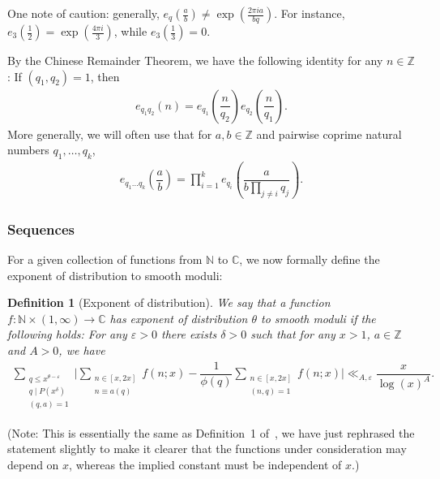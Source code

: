 \documentclass{amsart}
\newtheorem{defn}{Definition}
\numberwithin{equation}{section}
\begin{document}
One note of caution: generally, $e_q(\frac{a}{b}) \neq \exp(\frac{2\pi i a}{bq})$. For instance, $e_3(\frac{1}{2}) = \exp(\frac{4\pi i}{3})$, while $e_3(\frac{1}{3})=0$.

\vspace{3mm}
By the Chinese Remainder Theorem, we have the following  identity for any $n \in \mathbb{Z}$: If $(q_1,q_2)=1$, then
\begin{align*}
e_{q_1q_2}\left(n\right)=e_{q_1}\left(\dfrac{n}{q_2}\right)e_{q_2}\left(\dfrac{n}{q_1}\right).
\end{align*}
More generally, we will often use that for $a,b \in \mathbb{Z}$ and pairwise coprime natural numbers $q_1, \dots, q_k$,
\begin{align} \label{CRT}
e_{q_1\dots q_k}\left(\dfrac{a}{b}\right)=\prod_{i=1}^k e_{q_i}\left(\dfrac{a}{b\prod_{j \neq i} q_j}\right).
\end{align}

\subsubsection{Sequences}

For a given collection of functions from $\mathbb{N}$ to $\mathbb{C}$, we now formally define the  exponent of distribution to smooth moduli:

\begin{defn}[Exponent of distribution]
We say that a function $f: \mathbb{N} \times (1,\infty) \rightarrow \mathbb{C}$ has exponent of distribution $\theta$ to smooth moduli if the following holds: For any $\varepsilon >0$ there exists $\delta>0$ such that for any $x>1$,  $a \in \mathbb{Z}$ and  $A>0$, we have
\begin{align*}
\sum_{\substack{q \leq x^{\theta -\varepsilon } \\ q \mid P(x^\delta) \\ (q,a)=1}} \Bigg| \sum_{\substack{n \in [x,2x] \\ n \equiv a (q)}} f(n;x) - \dfrac{1}{\phi(q)} \sum_{\substack{n \in [x,2x] \\(n,q)=1 }}f(n;x) \Bigg| \ll_{A,\varepsilon} \dfrac{x}{\log(x)^A}.
\end{align*}
\end{defn}
(Note: This is essentially the same as  Definition~1 of~\cite{Baker:2017:BIP}, we have just rephrased the statement slightly to make it clearer that the functions under consideration may depend on $x$, whereas the implied constant must be independent of $x$.)
\end{document}
